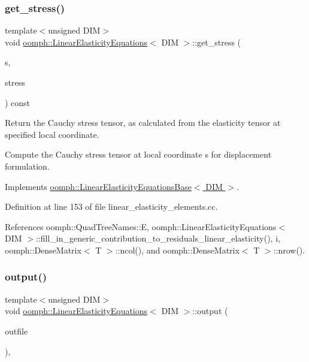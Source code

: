 \subsubsection{\texorpdfstring{get\+\_\+stress()}{get\_stress()}}
{\footnotesize\ttfamily template$<$unsigned D\+IM$>$ \\
void \hyperlink{classoomph_1_1LinearElasticityEquations}{oomph\+::\+Linear\+Elasticity\+Equations}$<$ D\+IM $>$\+::get\+\_\+stress (\begin{DoxyParamCaption}\item[{const \hyperlink{classoomph_1_1Vector}{Vector}$<$ double $>$ \&}]{s,  }\item[{\hyperlink{classoomph_1_1DenseMatrix}{Dense\+Matrix}$<$ double $>$ \&}]{stress }\end{DoxyParamCaption}) const\hspace{0.3cm}{\ttfamily [virtual]}}



Return the Cauchy stress tensor, as calculated from the elasticity tensor at specified local coordinate. 

Compute the Cauchy stress tensor at local coordinate s for displacement formulation. 

Implements \hyperlink{classoomph_1_1LinearElasticityEquationsBase_a2a68942bbdbe42a95e8c221fc5b1a322}{oomph\+::\+Linear\+Elasticity\+Equations\+Base$<$ D\+I\+M $>$}.



Definition at line 153 of file linear\+\_\+elasticity\+\_\+elements.\+cc.



References oomph\+::\+Quad\+Tree\+Names\+::E, oomph\+::\+Linear\+Elasticity\+Equations$<$ D\+I\+M $>$\+::fill\+\_\+in\+\_\+generic\+\_\+contribution\+\_\+to\+\_\+residuals\+\_\+linear\+\_\+elasticity(), i, oomph\+::\+Dense\+Matrix$<$ T $>$\+::ncol(), and oomph\+::\+Dense\+Matrix$<$ T $>$\+::nrow().

\mbox{\label{classoomph_1_1LinearElasticityEquations_a43d6b5b646f798329c1d77f64d26cdeb}} 
\subsubsection{\texorpdfstring{output()}{output()}\hspace{0.1cm}{\footnotesize\ttfamily [1/4]}}
{\footnotesize\ttfamily template$<$unsigned D\+IM$>$ \\
void \hyperlink{classoomph_1_1LinearElasticityEquations}{oomph\+::\+Linear\+Elasticity\+Equations}$<$ D\+IM $>$\+::output (\begin{DoxyParamCaption}\item[{std\+::ostream \&}]{outfile }\end{DoxyParamCaption})\hspace{0.3cm}{\ttfamily [inline]}, {\ttfamily [virtual]}}



